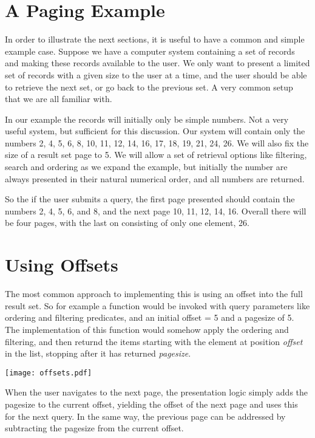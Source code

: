 \documentclass[11pt,a4paper]{article}
\begin{document}
\begin{multicols}{2}
\section*{A Paging Example}
In order to illustrate the next sections, it is useful to have a common and
simple example case. Suppose we have a computer system containing a set of
records and making these records available to the user. We only want to present
a limited set of records with a given size to the user at a time, and the user 
should be able to retrieve the next set, or go back to the previous set. A very
common setup that we are all familiar with.

In our example the records will initially only be simple numbers. Not a very
useful system, but sufficient for this discussion. Our system will contain only
the numbers 2, 4, 5, 6, 8, 10, 11, 12, 14, 16, 17, 18, 19, 21, 24, 26. We will
also fix the size of a result set page to 5. We will allow a set of retrieval
options like filtering, search and ordering as we expand the example, but
initially the number are always presented in their natural numerical order, and
all numbers are returned. 

So the if the user submits a query, the first page presented should contain the
numbers 2, 4, 5, 6, and 8, and the next page 10, 11, 12, 14, 16. Overall there
will be four pages, with the last on consisting of only one element, 26. 

\section*{Using Offsets}
The most common approach to implementing this is using an offset into the full
result set. So for example a function would be invoked with query parameters
like ordering and filtering predicates, and an initial offset = 5 and a
pagesize of 5. The implementation of this function would somehow apply the
ordering and filtering, and then returnd the items starting with the element at
position {\em offset} in the list, stopping after it has returned {\em
pagesize}. 

\texttt{[image: offsets.pdf]}

When the user navigates to the next page, the presentation logic simply adds the
pagesize to the current offset, yielding the offset of the next page and uses
this for the next query. In the same way, the previous page can be addressed by
subtracting the pagesize from the current offset. 


\end{multicols}
\end{document}
